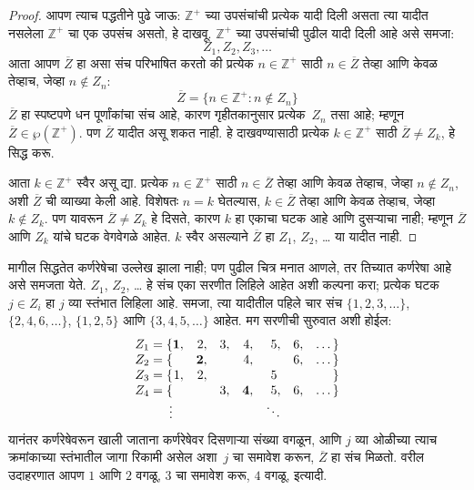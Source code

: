 \documentclass[11pt,a4paper,openany]{book}
\theoremstyle{definition}
\newenvironment{explain}{}{}
\newcommand{\Setabs}[2]{\{#1:#2\}}
\newcommand{\Pow}[1]{\wp(#1)}
\newcommand{\PosInt}{\mathbb{Z}^{+}}
\begin{document}
\begin{proof}
आपण त्याच पद्धतीने पुढे जाऊ: $\PosInt$ च्या उपसंचांची प्रत्येक यादी
दिली असता त्या यादीत नसलेला $\PosInt$ चा एक उपसंच असतो, हे दाखवू.
$\PosInt$ च्या उपसंचांची पुढील यादी दिली आहे असे समजा:
\[
Z_{1}, Z_{2}, Z_{3}, \dots
\]
आता आपण $\overline{Z}$ हा असा संच परिभाषित करतो की प्रत्येक
$n \in \PosInt$ साठी $n \in \overline{Z}$ तेव्हा आणि केवळ तेव्हाच,
जेव्हा $n \notin Z_{n}$:
\[
\overline{Z} = \Setabs{n \in \PosInt}{n \notin Z_n}
\]
$\overline{Z}$ हा स्पष्टपणे धन पूर्णांकांचा संच आहे, कारण गृहीतकानुसार
प्रत्येक~$Z_n$ तसा आहे; म्हणून $\overline{Z} \in
\Pow{\PosInt}$. पण $\overline{Z}$ यादीत असू शकत नाही. हे दाखवण्यासाठी
प्रत्येक $k \in \PosInt$ साठी $\overline{Z} \neq Z_k$, हे सिद्ध करू.

आता $k \in \PosInt$ स्वैर असू द्या. प्रत्येक $n \in \PosInt$ साठी
$n \in \overline{Z}$ तेव्हा आणि केवळ तेव्हाच, जेव्हा $n \notin Z_n$,
अशी $\overline{Z}$ ची व्याख्या केली आहे. विशेषतः $n=k$ घेतल्यास,
$k \in \overline{Z}$ तेव्हा आणि केवळ तेव्हाच, जेव्हा $k \notin Z_k$.
पण यावरून $\overline{Z} \neq Z_k$ हे दिसते, कारण $k$ हा एकाचा
घटक आहे आणि दुसऱ्याचा नाही; म्हणून $\overline{Z}$ आणि $Z_k$
यांचे घटक वेगवेगळे आहेत. $k$ स्वैर असल्याने $\overline{Z}$ हा
$Z_1$, $Z_2$, \dots{} या यादीत नाही.
\end{proof}

\begin{explain}
मागील सिद्धतेत कर्णरेषेचा उल्लेख झाला नाही; पण पुढील चित्र मनात आणले,
तर तिच्यात कर्णरेषा आहे असे समजता येते. $Z_1$, $Z_2$, \dots{} हे संच
एका सरणीत लिहिले आहेत अशी कल्पना करा; प्रत्येक घटक~$j \in Z_i$
हा $j$ व्या स्तंभात लिहिला आहे. समजा, त्या यादीतील पहिले चार संच
$\{1,2,3,\dots\}$, $\{2, 4, 6, \dots\}$, $\{1,2,5\}$ आणि
$\{3,4,5,\dots\}$ आहेत. मग सरणीची सुरुवात अशी होईल:
\[
\begin{array}{r@{}rrrrrrr}
  Z_1 = \{ & \mathbf{1}, & 2, & 3, & 4, & 5, & 6, & \dots\}\\
  Z_2 = \{ &  & \mathbf{2}, &  & 4, &  & 6, & \dots\}\\
  Z_3 = \{ & 1, & 2, &  &  & 5\phantom{,} &  & \}\\
  Z_4 = \{ &  &  & 3, & \mathbf{4}, & 5, & 6, & \dots\}\\
  \vdots & & & & & \ddots
\end{array}
\]
यानंतर कर्णरेषेवरून खाली जाताना कर्णरेषेवर दिसणाऱ्या संख्या वगळून,
आणि $j$ व्या ओळीच्या त्याच क्रमांकाच्या स्तंभातील जागा रिकामी असेल अशा~$j$
चा समावेश करून, $\overline{Z}$ हा संच मिळतो. वरील उदाहरणात
आपण $1$ आणि $2$ वगळू, $3$ चा समावेश करू, $4$ वगळू, इत्यादी.
\end{explain}
\end{document}
